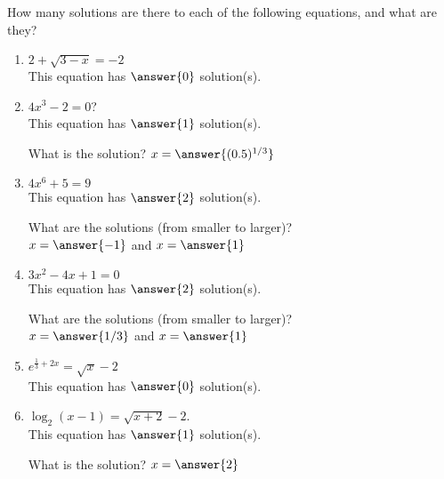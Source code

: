 \documentclass{ximera}
\author{Elizabeth Campolongo}
\begin{document}
\begin{exercise}
How many solutions are there to each of the following equations, and what are they?
\begin{enumerate}
\item $2+\sqrt{3-x}=-2$ \\
This equation has $\answer{0}$ solution(s).
%
\item $4x^3-2=0$? \\
This equation has $\answer{1}$ solution(s).
%
\begin{exercise}
What is the solution?
$x=\answer{(0.5)^{1/3}}$
\end{exercise}

\item $4x^6+5=9$ \\
This equation has $\answer{2}$ solution(s).
\begin{exercise}
What are the solutions (from smaller to larger)?\\
$x=\answer{-1}$ and $x=\answer{1}$
\end{exercise}

\item $3x^2-4x+1=0$ \\
This equation has $\answer{2}$ solution(s).
\begin{exercise}
What are the solutions (from smaller to larger)?\\
$x=\answer{1/3}$ and $x=\answer{1}$
\end{exercise}

\item $e^{\frac{1}{3} + 2x}=\sqrt{x}-2$ \\
This equation has $\answer{0}$ solution(s).

\item $\log_2(x-1) =\sqrt{x+2}-2$. \\
This equation has $\answer{1}$ solution(s).
\begin{exercise}
What is the solution?
$x=\answer{2}$
\end{exercise}


\end{enumerate}
\end{exercise}
\end{document}
